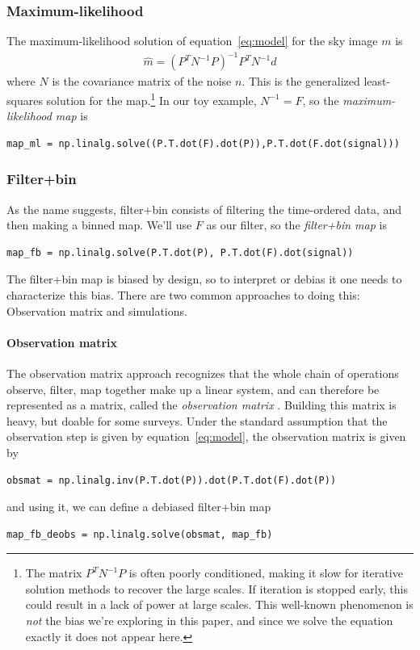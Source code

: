 \documentclass[twocolumn,apj]{aastex63}
\begin{document}
\subsubsection{Maximum-likelihood}
The maximum-likelihood solution of equation~\ref{eq:model} for the
sky image $m$ is
\begin{align}
	\hat m = (P^TN^{-1}P)^{-1}P^TN^{-1}d
\end{align}
where $N$ is the covariance matrix of the noise $n$. This is the
generalized least-squares solution for the map.\footnote{
	The matrix $P^TN^{-1}P$ is often poorly conditioned, making it slow
	for iterative solution methods to recover the large scales. If iteration is
	stopped early, this could result in a lack of power at large scales.
	This well-known phenomenon is \emph{not} the bias we're exploring in
	this paper, and since we solve the equation exactly it does not
	appear here.
}
In our toy example, $N^{-1} = F$, so the \emph{maximum-likelihood map}
is
\begin{lstlisting}
map_ml = np.linalg.solve((P.T.dot(F).dot(P)),P.T.dot(F.dot(signal)))
\end{lstlisting}

\subsubsection{Filter+bin}
As the name suggests, filter+bin consists of filtering the time-ordered
data, and then making a binned map. We'll use $F$ as our filter, so
the \emph{filter+bin map} is
\begin{lstlisting}
map_fb = np.linalg.solve(P.T.dot(P), P.T.dot(F).dot(signal))
\end{lstlisting}
The filter+bin map is biased by design, so to interpret or debias it one
needs to characterize this bias. There are two common approaches
to doing this: Observation matrix and simulations.

\paragraph{Observation matrix}
The observation matrix approach
recognizes that the whole chain of operations observe, filter, map
together make up a linear system, and can therefore be represented
as a matrix, called the \emph{observation matrix} \citep{bicep2-obsmat}.
Building this matrix is heavy, but doable for some
surveys. Under the standard assumption that the observation step is
given by equation~\ref{eq:model}, the observation matrix is given by
\begin{lstlisting}
obsmat = np.linalg.inv(P.T.dot(P)).dot(P.T.dot(F).dot(P))
\end{lstlisting}
and using it, we can define a debiased filter+bin map
\begin{lstlisting}
map_fb_deobs = np.linalg.solve(obsmat, map_fb)
\end{lstlisting}
\end{document}
